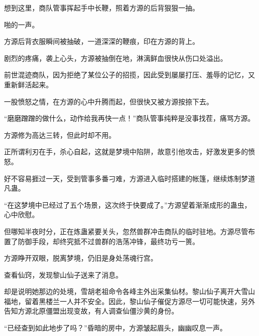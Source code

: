 \begin{this_body}
想到这里，商队管事挥起手中长鞭，照着方源的后背狠狠一抽。

啪的一声。

方源后背衣服瞬间被抽破，一道深深的鞭痕，印在方源的背上。

剧烈的疼痛，袭上心头，方源被抽倒在地，淋漓鲜血很快从伤口处溢出。

前世混迹商队，因为拒绝了某位公子的招揽，因此受到屡屡打压、羞辱的记忆，又重新鲜活起来。

一股愤怒之情，在方源的心中升腾而起，但很快又被方源按捺下去。

“磨磨蹭蹭的做什么，动作给我再快一点！”商队管事纯粹是没事找茬，痛骂方源。

方源修为高达三转，但此时却不用。

正所谓利刃在手，杀心自起，这就是梦境中陷阱，故意引他攻击，好激发更多的愤怒。

好不容易捱过一天，受到管事多番刁难，方源进入临时搭建的帐篷，继续炼制梦道凡蛊。

“在这梦境中已经过了五个场景，这次终于快要成了。”方源望着渐渐成形的蛊虫，心中欣慰。

但哪知半夜时分，正在炼蛊紧要关头，忽然兽群冲击商队的临时驻地。方源尽管布置了防御手段，却终究抵不过兽群的浩荡冲锋，最终功亏一篑。

方源睁开双眼，脱离梦境，仍旧是身处荡魂行宫。

查看仙窍，发现黎山仙子送来了消息。

却是说明她那边的处境，雪胡老祖命令各峰主外出采集仙材。黎山仙子离开大雪山福地，留着黑楼兰一人并不安全。因此，黎山仙子催促方源尽一切可能快速，另外告知方源北原僵盟出现变故，有人调查仙僵沙黄的身份。

“已经查到如此地步了吗？”昏暗的房中，方源皱起眉头，幽幽叹息一声。

\end{this_body}

